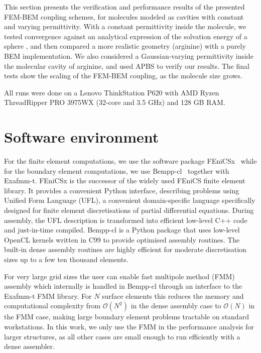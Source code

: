 This section presents the verification and performance results of the presented FEM-BEM coupling schemes, for molecules modeled as cavities with constant and varying permittivity.
With a constant permittivity inside the molecule, we tested convergence against an analytical expression of the solvation energy of a sphere \cite{Kirkwood1934}, and then compared a more realistic geometry (arginine) with a purely BEM implementation.
We also considered a Gaussian-varying permittivity\cite{grant2001smooth,li2013dielectric} inside the molecular cavity of arginine, and used APBS \cite{BakerETal2001} to verify our results.
The final tests show the scaling of the FEM-BEM coupling, as the molecule size grows. 

All runs were done on a Lenovo ThinkStation P620 with AMD Ryzen ThreadRipper PRO 3975WX (32-core and 3.5 GHz) and 128 GB RAM. 

\section*{\sffamily \Large Software environment}

For the finite element computations, we use the software package FEniCSx~\cite{BasixJoss} while for the boundary element computations, we use Bempp-cl~\cite{BetckeScroggs2021} together with Exafmm-t. FEniCSx is the successor of the widely used FEniCS finite element library.
It provides a convenient Python interface, describing problems using Unified Form Language (UFL), a convenient domain-specific language specifically designed for finite element discretisations of partial differential equations. During assembly, the UFL description is transformed into efficient low-level C++ code and just-in-time compiled. Bempp-cl is a Python package that uses low-level OpenCL kernels written in C99 to provide optimised assembly routines. The built-in dense assembly routines are highly efficient for moderate discretisation sizes up to a few ten thousand elements.

For very large grid sizes the user can enable fast multipole method (FMM) assembly which internally is handled in Bempp-cl through an interface to the Exafmm-t FMM library. For $N$ surface elements this reduces the memory and computational complexity from $\mathcal{O}(N^2)$ in the dense assembly case to $\mathcal{O}(N)$ in the FMM case, making large boundary element problems tractable on standard workstations. In this work, we only use the FMM in the performance analysis for larger structures, as all other cases are small enough to run efficiently with a dense assembler. 

